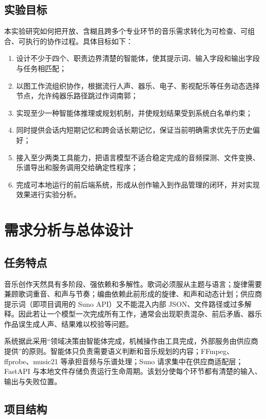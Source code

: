 \documentclass{SYSUReport}
\begin{document}
\subsection{实验目标}

本实验研究如何把开放、含糊且跨多个专业环节的音乐需求转化为可检查、可组合、可执行的协作过程。具体目标如下：

\begin{enumerate}
    \item 设计不少于四个、职责边界清楚的智能体，使其提示词、输入字段和输出字段与任务相匹配；
    \item 以图工作流组织协作，根据流行人声、器乐、电子、影视配乐等任务动态选择节点，允许纯器乐路径跳过作词南郭；
    \item 实现至少一种智能体推理或规划机制，并使规划结果受到系统白名单约束；
    \item 同时提供会话内短期记忆和跨会话长期记忆，保证当前明确需求优先于历史偏好；
    \item 接入至少两类工具能力，把语言模型不适合稳定完成的音频探测、文件变换、乐谱导出和服务调用交给确定性程序；
    \item 完成可本地运行的前后端系统，形成从创作输入到作品管理的闭环，并对实现效果进行实验分析。
\end{enumerate}

\section{需求分析与总体设计}

\subsection{任务特点}

音乐创作天然具有多阶段、强依赖和多解性。歌词必须服从主题与语言；旋律需要兼顾歌词重音、和声与节奏；编曲依赖此前形成的旋律、和声和动态计划；供应商提示词（即项目调用的 Suno API）又不能混入内部 JSON、文件路径或过多解释。因此若让一个模型一次完成所有工作，通常会出现职责混杂、前后矛盾、器乐作品误生成人声、结果难以校验等问题。

系统据此采用“领域决策由智能体完成，机械操作由工具完成，外部服务由供应商提供”的原则。智能体只负责需要语义判断和音乐规划的内容；FFmpeg、ffprobe、music21 等承担音频与乐谱处理；Suno 请求集中在供应商适配层；FastAPI 与本地文件存储负责运行生命周期。该划分使每个环节都有清楚的输入、输出与失败位置。

\subsection{项目结构}
\end{document}
